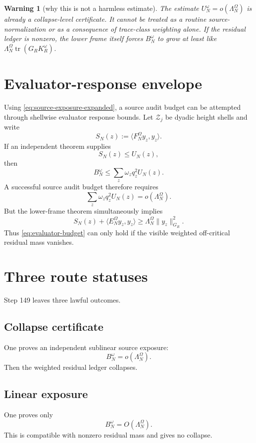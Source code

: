 \documentclass[11pt]{article}
\newtheorem{warning}{Warning}
\newcommand{\tr}{\operatorname{tr}}
\begin{document}
\begin{warning}[why this is not a harmless estimate]
The estimate \(U_N^\omega=o(\Lambda_N^\Omega)\) is already a collapse-level certificate.  It cannot be treated as a routine source-normalization or as a consequence of trace-class weighting alone.  If the residual ledger is nonzero, the lower frame itself forces \(B_N^\omega\) to grow at least like \(\Lambda_N^\Omega\tr(G_RK_R^\omega)\).
\end{warning}

\section{Evaluator-response envelope}
Using \eqref{eq:source-exposure-expanded}, a source audit budget can be attempted through shellwise evaluator response bounds.  Let \(\mathcal Z_j\) be dyadic height shells and write
\[
  S_N(z):=\langle F_N^\Omega y_z,y_z\rangle.
\]
If an independent theorem supplies
\[
  S_N(z)\le U_N(z),
\]
then
\[
  B_N^\omega\le \sum_z\omega_zq_z^2U_N(z).
\]
A successful source audit budget therefore requires
\begin{equation}\label{eq:evaluator-budget}
  \sum_z\omega_zq_z^2U_N(z)=o(\Lambda_N^\Omega).
\end{equation}
But the lower-frame theorem simultaneously implies
\[
  S_N(z)+\langle E_N^\Omega y_z,y_z\rangle
  \ge
  \Lambda_N^\Omega\|y_z\|_{G_R}^2.
\]
Thus \eqref{eq:evaluator-budget} can only hold if the visible weighted off-critical residual mass vanishes.

\section{Three route statuses}
Step 149 leaves three lawful outcomes.

\subsection*{Collapse certificate}
One proves an independent sublinear source exposure:
\[
  B_N^\omega=o(\Lambda_N^\Omega).
\]
Then the weighted residual ledger collapses.

\subsection*{Linear exposure}
One proves only
\[
  B_N^\omega=O(\Lambda_N^\Omega).
\]
This is compatible with nonzero residual mass and gives no collapse.
\end{document}
